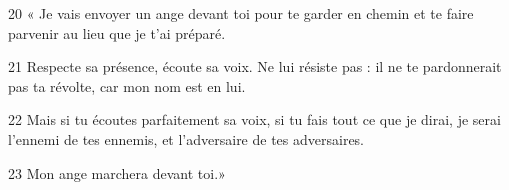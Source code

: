 20 « Je vais envoyer un ange devant toi pour te garder en chemin et te faire parvenir au lieu que je t’ai préparé.

21 Respecte sa présence, écoute sa voix. Ne lui résiste pas : il ne te pardonnerait pas ta révolte, car mon nom est en lui.

22 Mais si tu écoutes parfaitement sa voix, si tu fais tout ce que je dirai, je serai l’ennemi de tes ennemis, et l’adversaire de tes adversaires.

23 Mon ange marchera devant toi.»